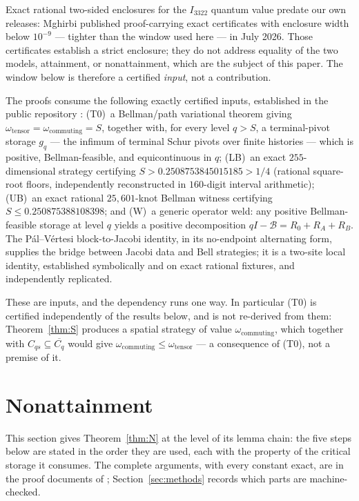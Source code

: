 \documentclass[11pt]{article}
\theoremstyle{remark}
\newcommand{\Cq}{C_q}
\newcommand{\Cqs}{C_{qs}}
\newcommand{\B}{\mathcal{B}}
\begin{document}
Exact rational two-sided enclosures for the $I_{3322}$ quantum value predate
our own releases: Mghirbi \cite{Mghirbi} published proof-carrying
exact certificates with enclosure width below $10^{-9}$ --- tighter than the
window used here --- in July 2026. Those certificates establish a strict
enclosure; they do not address equality of the two models, attainment, or
nonattainment, which are the subject of this paper. The window below is
therefore a certified \emph{input}, not a contribution.

The proofs consume the following exactly certified inputs, established in
the public repository \cite{Repo}: (T0)~a Bellman/path variational theorem
giving $\omega_{\mathrm{tensor}}=\omega_{\mathrm{commuting}}=S$, together
with, for every level $q>S$, a terminal-pivot storage $g_q$ --- the infimum
of terminal Schur pivots over finite histories --- which is positive,
Bellman-feasible, and equicontinuous in $q$; (LB)~an exact $255$-dimensional
strategy certifying $S>0.2508753845015185>1/4$ (rational square-root floors,
independently reconstructed in $160$-digit interval arithmetic); (UB)~an
exact rational $25{,}601$-knot Bellman witness certifying
$S\le 0.250875388108398$; and (W)~a generic operator weld: any positive
Bellman-feasible storage at level $q$ yields a positive decomposition
$qI-\B=R_0+R_A+R_B$. The P\'al--V\'ertesi block-to-Jacobi identity, in its
no-endpoint alternating form, supplies the bridge between Jacobi data and
Bell strategies; it is a two-site local identity, established symbolically
and on exact rational fixtures, and independently replicated.

These are inputs, and the dependency runs one way. In particular (T0) is
certified independently of the results below, and is not re-derived from
them: Theorem~\ref{thm:S} produces a spatial strategy of value
$\omega_{\mathrm{commuting}}$, which together with
$\Cqs\subseteq\overline{\Cq}$ would give
$\omega_{\mathrm{commuting}}\le\omega_{\mathrm{tensor}}$ --- a consequence of
(T0), not a premise of it.

\section{Nonattainment}\label{sec:N}

This section gives Theorem~\ref{thm:N} at the level of its lemma chain: the
five steps below are stated in the order they are used, each with the
property of the critical storage it consumes. The complete arguments, with
every constant exact, are in the proof documents of \cite{Repo};
Section~\ref{sec:methods} records which parts are machine-checked.
\end{document}
